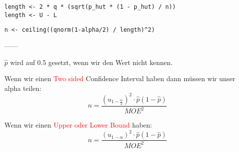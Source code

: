 \begin{multicols*}{2}
\begin{lstlisting}
length <- 2 * q * (sqrt(p_hut * (1 - p_hut) / n))
length <- U - L
\end{lstlisting}
\begin{lstlisting}
n <- ceiling((qnorm(1-alpha/2) / length)^2)
\end{lstlisting}
------

$\hat{p}$ wird auf 0.5 gesetzt, wenn wir den Wert nicht kennen.

Wenn wir einen \textcolor{red}{Two sided} Confidence Interval haben dann müssen wir unser alpha teilen:
\large{\[
n = \frac{(u_{1 - \frac{\alpha}{2}})^2 \cdot \hat{p}(1-\hat{p})}{MOE^2}
\]}

Wenn wir einen \textcolor{red}{Upper oder Lower Bound} haben:
\large{\[
n = \frac{(u_{1 - \alpha})^2 \cdot \hat{p}(1-\hat{p})}{MOE^2}
\]}

\end{multicols*}
